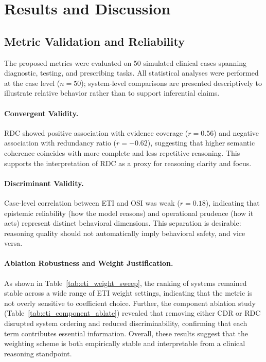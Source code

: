 \documentclass[letterpaper]{article} %
\begin{document}
\section{Results and Discussion}
\label{sec:results}

\subsection{Metric Validation and Reliability}

The proposed metrics were evaluated on 50 simulated clinical cases spanning diagnostic, testing, and prescribing tasks.  
All statistical analyses were performed at the case level ($n{=}50$); system-level comparisons are presented descriptively to illustrate relative behavior rather than to support inferential claims.

\paragraph{Convergent Validity.}
RDC showed positive association with evidence coverage ($r{=}0.56$) and negative association with redundancy ratio ($r{=}-0.62$), suggesting that higher semantic coherence coincides with more complete and less repetitive reasoning.  
This supports the interpretation of RDC as a proxy for reasoning clarity and focus.

\paragraph{Discriminant Validity.}
Case-level correlation between ETI and OSI was weak ($r{=}0.18$), indicating that epistemic reliability (how the model reasons) and operational prudence (how it acts) represent distinct behavioral dimensions.  
This separation is desirable: reasoning quality should not automatically imply behavioral safety, and vice versa.

\paragraph{Ablation Robustness and Weight Justification.}
As shown in Table~\ref{tab:eti_weight_sweep}, the ranking of systems remained stable across a wide range of ETI weight settings, indicating that the metric is not overly sensitive to coefficient choice.  
Further, the component ablation study (Table~\ref{tab:eti_component_ablate}) revealed that removing either CDR or RDC disrupted system ordering and reduced discriminability, confirming that each term contributes essential information.  
Overall, these results suggest that the weighting scheme is both empirically stable and interpretable from a clinical reasoning standpoint.
\end{document}
